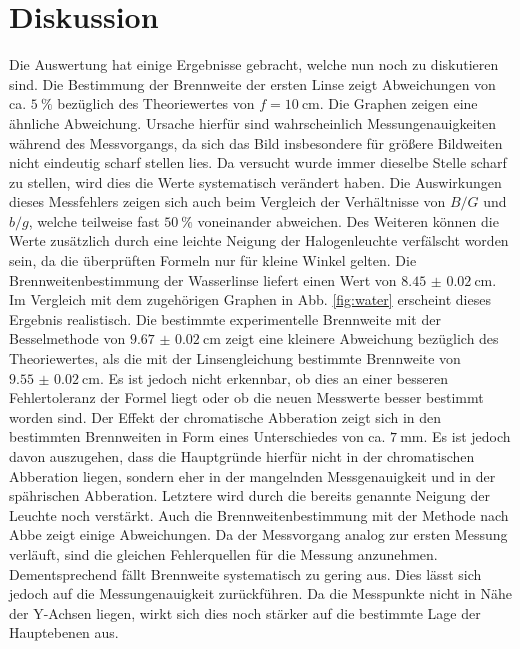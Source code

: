 
\section{Diskussion}
\label{sec:Diskussion}
Die Auswertung hat einige Ergebnisse gebracht, welche nun noch zu diskutieren sind.
Die Bestimmung der Brennweite der ersten Linse zeigt Abweichungen von
 ca. $\SI{5}{\percent}$ bezüglich des Theoriewertes von $f = \SI{10}{\centi\meter}$.
  Die Graphen zeigen eine ähnliche Abweichung. Ursache hierfür sind wahrscheinlich
   Messungenauigkeiten während des Messvorgangs, da sich das Bild insbesondere für
   größere Bildweiten nicht eindeutig scharf stellen lies. Da versucht wurde immer dieselbe Stelle
    scharf zu stellen, wird dies die Werte systematisch verändert haben. Die Auswirkungen dieses Messfehlers
   zeigen sich auch beim Vergleich der Verhältnisse von $B/G$ und $b/g$,
    welche teilweise fast $\SI{50}{\percent}$ voneinander abweichen. Des Weiteren können
     die Werte zusätzlich durch eine leichte Neigung der Halogenleuchte verfälscht worden sein,
     da die überprüften Formeln nur für kleine Winkel gelten. Die
      Brennweitenbestimmung der Wasserlinse liefert einen Wert von $\SI{8.45(2)}{\centi\meter}$.
      Im Vergleich mit dem zugehörigen Graphen in Abb. \ref{fig:water} erscheint dieses Ergebnis realistisch.
       Die bestimmte experimentelle Brennweite mit der Besselmethode von $\SI{9.67(2)}{\centi\meter}$ zeigt eine
        kleinere Abweichung bezüglich des Theoriewertes, als die mit der Linsengleichung bestimmte Brennweite von $\SI{9.55(2)}{\centi\meter}$.
        Es ist jedoch nicht erkennbar, ob dies an einer besseren Fehlertoleranz der Formel liegt oder ob die neuen Messwerte besser bestimmt worden sind.
         Der Effekt der chromatische Abberation zeigt sich in den bestimmten
         Brennweiten in Form eines Unterschiedes von ca. $\SI{7}{\milli\meter}$. Es
          ist jedoch davon auszugehen, dass die Hauptgründe hierfür nicht in der
           chromatischen Abberation liegen, sondern eher in der mangelnden
            Messgenauigkeit und in der spährischen Abberation. Letztere wird durch
            die bereits genannte Neigung der Leuchte noch verstärkt. Auch die
            Brennweitenbestimmung mit der Methode nach Abbe zeigt einige Abweichungen.
            Da der Messvorgang analog zur ersten Messung verläuft, sind die
            gleichen Fehlerquellen für die Messung anzunehmen. Dementsprechend
            fällt Brennweite systematisch zu gering aus. Dies lässt sich jedoch auf die Messungenauigkeit zurückführen.
            Da die Messpunkte
             nicht in Nähe der Y-Achsen liegen, wirkt sich dies noch
             stärker auf die bestimmte Lage der Hauptebenen aus.

